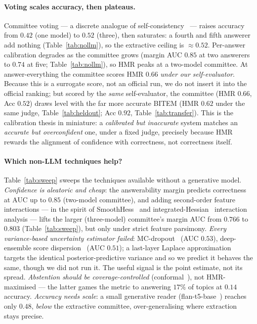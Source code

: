 \documentclass[sigconf,nonacm]{acmart}
\newcommand{\HMR}{\textsc{HMR}}
\begin{document}
\paragraph{Voting scales accuracy, then plateaus.} Committee voting --- a discrete
analogue of self-consistency~\cite{selfconsistency} --- raises accuracy from $0.42$
(one model) to $0.52$ (three), then saturates: a fourth and fifth answerer add
nothing (Table~\ref{tab:nollm}), so the extractive ceiling is $\approx0.52$.
Per-answer calibration degrades as the committee grows (margin AUC $0.85$ at two
answerers to $0.74$ at five; Table~\ref{tab:nollm}), so \HMR{} peaks at a two-model
committee. At answer-everything the committee scores \HMR{} $0.66$ \emph{under our
self-evaluator}. Because this is a surrogate score, not an official run, we do not insert it
into the official ranking; but scored by the \emph{same} self-evaluator, the committee
(\HMR{} $0.66$, Acc $0.52$) draws level with the far more accurate BITEM (\HMR{} $0.62$
under the same judge, Table~\ref{tab:heldout}; Acc $0.92$, Table~\ref{tab:transfer}). This is the calibration thesis in
miniature: a \emph{calibrated but inaccurate} system matches
an \emph{accurate but overconfident} one, under a fixed judge, precisely because \HMR{}
rewards the alignment of confidence with correctness, not correctness itself.

\paragraph{Which non-LLM techniques help?} Table~\ref{tab:sweep} sweeps the
techniques available without a generative model. \emph{Confidence is aleatoric and
cheap}: the answerability margin predicts correctness at AUC up to $0.85$ (two-model
committee), and adding second-order feature interactions --- in the spirit of
SmoothHess~\cite{smoothhess} and integrated-Hessian~\cite{inthessians} interaction analysis
--- lifts the larger (three-model) committee's margin AUC from $0.766$ to $0.803$
(Table~\ref{tab:sweep}), but only under strict feature parsimony. \emph{Every variance-based
uncertainty estimator failed}: MC-dropout~\cite{gal2016} (AUC $0.53$), deep-ensemble
score dispersion~\cite{ensembles2017} (AUC $0.51$); a last-layer Laplace
approximation~\cite{laplace2021} targets the identical posterior-predictive variance and so
we predict it behaves the same, though we did not run it.
The useful signal is the point estimate, not its spread. \emph{Abstention should be
coverage-controlled} (conformal~\cite{conformal2023,mohri2024}), not \HMR-maximised
--- the latter games the metric to answering $17\%$ of topics at $0.14$ accuracy.
\emph{Accuracy needs scale}: a small generative reader (flan-t5-base~\cite{flant5})
reaches only $0.48$, \emph{below} the extractive committee, over-generalising where
extraction stays precise.
\end{document}
